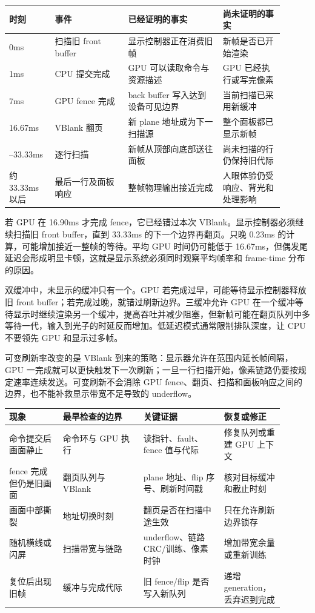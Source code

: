 \begin{longtable}{L{0.15\linewidth}L{0.24\linewidth}L{0.31\linewidth}L{0.20\linewidth}}
\toprule
时刻 & 事件 & 已经证明的事实 & 尚未证明的事实 \\
\midrule
0ms & 扫描旧 front buffer & 显示控制器正在消费旧帧 & 新帧是否已开始渲染 \\\tablerowrule
1ms & CPU 提交完成 & GPU 可以读取命令与资源描述 & GPU 已经执行或写完像素 \\\tablerowrule
7ms & GPU fence 完成 & back buffer 写入达到设备可见边界 & 当前扫描已采用新缓冲 \\\tablerowrule
16.67ms & VBlank 翻页 & 新 plane 地址成为下一扫描源 & 整个面板都已显示新帧 \\--33.33ms & 逐行扫描 & 新帧从顶部向底部送往面板 & 尚未扫描的行仍保持旧代际 \\\tablerowrule
约 33.33ms 以后 & 最后一行及面板响应 & 整帧物理输出接近完成 & 人眼体验仍受响应、背光和处理影响 \\
\bottomrule
\end{longtable}

若 GPU 在 16.90ms 才完成 fence，它已经错过本次 VBlank。显示控制器必须继续扫描旧 front buffer，直到 33.33ms 的下一个边界再翻页。只晚 0.23ms 的计算，可能增加接近一整帧的等待。平均 GPU 时间仍可能低于 16.67ms，但偶发尾延迟会形成明显卡顿，这就是显示系统必须同时观察平均帧率和 frame-time 分布的原因。


双缓冲中，未显示的缓冲只有一个。GPU 若完成过早，可能等待显示控制器释放旧 front buffer；若完成过晚，就错过刷新边界。三缓冲允许 GPU 在一个缓冲等待显示时继续渲染另一个缓冲，提高吞吐并减少阻塞，但新帧可能在翻页队列中多等待一代，输入到光子的时延反而增加。低延迟模式通常限制排队深度，让 CPU 不要领先 GPU 和显示过多帧。

可变刷新率改变的是 VBlank 到来的策略：显示器允许在范围内延长帧间隔，GPU 一完成就可以更快触发下一次刷新；一旦一行扫描开始，像素链路仍要按规定速率连续发送。可变刷新不会消除 GPU fence、翻页、扫描和面板响应之间的边界，也不能补救显示带宽不足导致的 underflow。

\begin{longtable}{L{0.18\linewidth}L{0.27\linewidth}L{0.27\linewidth}L{0.18\linewidth}}
\toprule
现象 & 最早检查的边界 & 关键证据 & 恢复或修正 \\
\midrule
命令提交后画面静止 & 命令环与 GPU 执行 & 读指针、fault、fence 值与代际 & 修复队列或重建 GPU 上下文 \\\tablerowrule
fence 完成但仍是旧画面 & 翻页队列与 VBlank & plane 地址、flip 序号、刷新时间戳 & 核对目标缓冲和截止时刻 \\\tablerowrule
画面中部撕裂 & 地址切换时刻 & 翻页是否在扫描中途生效 & 只在允许刷新边界锁存 \\\tablerowrule
随机横线或闪屏 & 扫描带宽与链路 & underflow、链路 CRC/训练、像素时钟 & 增加带宽余量或重新训练 \\\tablerowrule
复位后出现旧帧 & 缓冲与完成代际 & 旧 fence/flip 是否写入新队列 & 递增 generation，丢弃迟到完成 \\
\bottomrule
\end{longtable}

